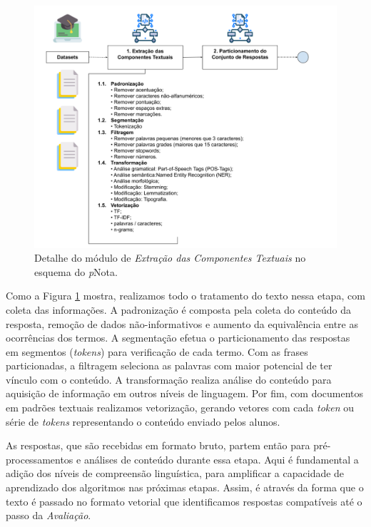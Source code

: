 \begin{figure}[!h]
\centering
\includegraphics[width=\textwidth]{figuras/esquema-ect-pNota.png}
\caption{Detalhe do módulo de \textit{Extração das Componentes Textuais} no esquema do \textit{p}Nota.}
\label{fig-ect}
\end{figure}

Como a Figura \ref{fig-ect} mostra, realizamos todo o tratamento do texto nessa etapa, com coleta das informações. A padronização é composta pela coleta do conteúdo da resposta, remoção de dados não-informativos e aumento da equivalência entre as ocorrências dos termos. A segmentação efetua o particionamento das respostas em segmentos (\textit{tokens}) para verificação de cada termo. Com as frases particionadas, a filtragem seleciona as palavras com maior potencial de ter vínculo com o conteúdo. A transformação realiza análise do conteúdo para aquisição de informação em outros níveis de linguagem. Por fim, com documentos em padrões textuais realizamos vetorização, gerando vetores com cada \textit{token} ou série de \textit{tokens} representando o conteúdo enviado pelos alunos.

As respostas, que são recebidas em formato bruto, partem então para pré-processamentos e análises de conteúdo durante essa etapa. Aqui é fundamental a adição dos níveis de compreensão linguística, para amplificar a capacidade de aprendizado dos algoritmos nas próximas etapas. Assim, é através da forma que o texto é passado no formato vetorial \cite{baeza2011} que identificamos respostas compatíveis até o passo da \textit{Avaliação}.


